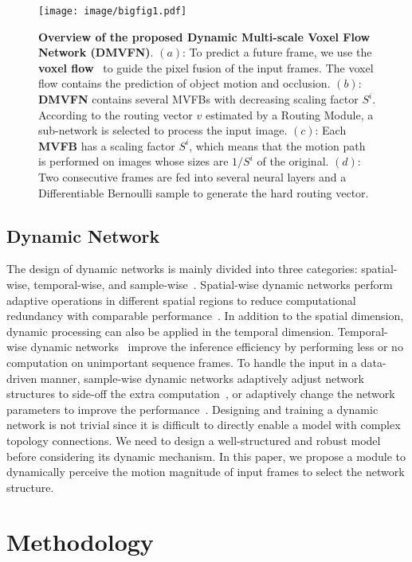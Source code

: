 \documentclass[10pt,twocolumn,letterpaper]{article}
\begin{document}
\begin{figure*}[ht]
	\centering
	\texttt{[image: image/bigfig1.pdf]}
	\caption{\textbf{Overview of the proposed Dynamic Multi-scale Voxel Flow Network (DMVFN)}.
$(a)$: To predict a future frame, we use the \textbf{voxel flow}~\cite{dvf} to guide the pixel fusion of the input frames. The voxel flow contains the prediction of object motion and occlusion. $(b)$: \textbf{DMVFN} contains several MVFBs with decreasing scaling factor $S^i$.
According to the routing vector $v$ estimated by a Routing Module, a sub-network is selected to process the input image. 
$(c)$: Each \textbf{MVFB} has a scaling factor $S^i$, which means that the motion path is performed on images whose sizes are $1/S^i$ of the original. $(d)$: Two consecutive frames are fed into several neural layers and a Differentiable Bernoulli sample to generate the hard routing vector.
}
	\label{fig:predict}
\end{figure*}

\subsection{Dynamic Network}
The design of dynamic networks is mainly divided into three categories: spatial-wise, temporal-wise, and sample-wise~\cite{dynamicnn}. Spatial-wise dynamic networks perform adaptive operations in different spatial regions to reduce computational redundancy with comparable performance~\cite{sbnet,dynamicconv,mga}. In addition to the spatial dimension, dynamic processing can also be applied in the temporal dimension. Temporal-wise dynamic networks~\cite{yeung2016end, su2016leaving, wu2019adaframe} improve the inference efficiency by performing less or no computation on unimportant sequence frames.
To handle the input in a data-driven manner, sample-wise dynamic networks adaptively adjust network structures to side-off the extra computation~\cite{skipnet,veit2018convolutional}, or adaptively change the network parameters to improve the performance~\cite{harley2017segmentation,su2019pixel,dcn,dcn2}. Designing and training a dynamic network is not trivial since it is difficult to directly enable a model with complex topology connections. We need to design a well-structured and robust model before considering its dynamic mechanism. In this paper, we propose a module to dynamically perceive the motion magnitude of input frames to select the network structure.
 	


\section{Methodology}
\end{document}
